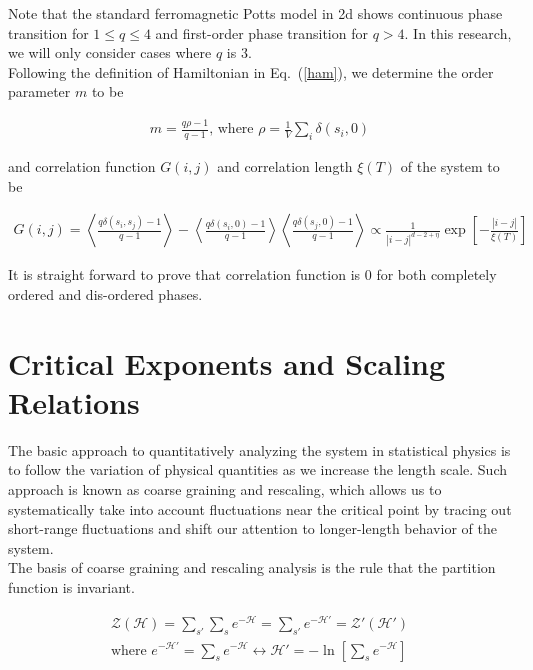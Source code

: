 \documentclass[%
 reprint,
 amsmath,amssymb,
 aps,
]{revtex4-2}
\begin{document}
Note that the standard ferromagnetic Potts model in 2d shows continuous phase transition 
for $1 \leq q \leq 4$ and first-order phase transition for $q>4$. In this research, we 
will only consider cases where $q$ is $3$.\\

Following the definition of Hamiltonian in Eq.~(\ref{ham}), we determine the order 
parameter $m$ to be

\begin{eqnarray}
m = \frac{q \rho - 1}{q - 1} \text{, where } \rho = \frac{1}{V} \sum_{i} 
\delta(s_{i},0) \label{order}
\end{eqnarray}

and correlation function $G(i,j)$ and correlation length $\xi(T)$ of the system to be

\begin{widetext}
\begin{eqnarray}
G(i,j) = \left<\frac{q \delta(s_{i}, s_{j}) - 1}{q - 1}\right> - \left<\frac{q 
\delta(s_{i}, 0) - 1}{q - 1}\right> \left<\frac{q \delta(s_{j}, 0) - 1}{q - 1}\right> 
\propto \frac{1}{|i-j|^{d-2+\eta}} \exp \left[-\frac{|i-j|}{\xi(T)}\right] \label{corr}
\end{eqnarray}
\end{widetext}

It is straight forward to prove that correlation function is $0$ for both completely 
ordered and dis-ordered phases.

\section{\label{sec:scaling} Critical Exponents and Scaling Relations}

The basic approach to quantitatively analyzing the system in statistical physics is 
to follow the variation of physical quantities as we increase the length scale. Such 
approach is known as coarse graining and rescaling, which allows us to systematically 
take into account fluctuations near the critical point by tracing out short-range 
fluctuations and shift our attention to longer-length behavior of the system. \\

The basis of coarse graining and rescaling analysis is the rule that the partition 
function is invariant.

\begin{gather}
\mathcal{Z}(\mathcal{H}) = \sum_{s'}\sum_{s}e^{-\mathcal{H}} = \sum_{s'}
e^{-\mathcal{H}'} = \mathcal{Z}'\left(\mathcal{H}'\right) \label{parequal}\\
\text{where } e^{-\mathcal{H}'} = \sum_{s} e^{-\mathcal{H}} \leftrightarrow 
\mathcal{H}' = - \ln \left[\sum_{s} e^{-\mathcal{H}}\right]
\end{gather}
\end{document}
